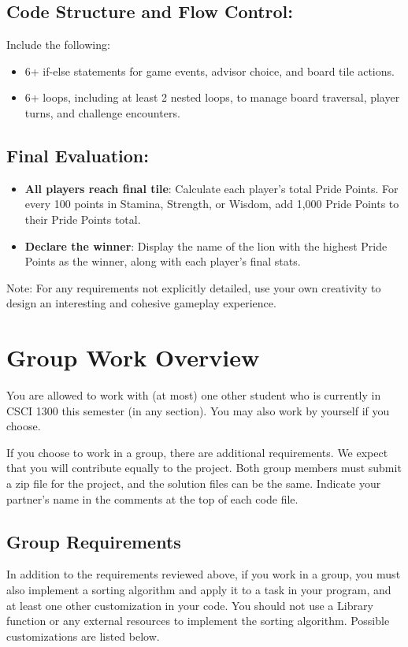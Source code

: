 \subsection{Code Structure and Flow Control:}
Include the following:
\begin{itemize}
    \item 6+ if-else statements for game events, advisor choice, and board tile actions.
    \item 6+ loops, including at least 2 nested loops, to manage board traversal, player turns, and challenge encounters.
\end{itemize}


\subsection{Final Evaluation:}
\begin{itemize}
    \item \textbf{All players reach final tile}: Calculate each player's total Pride Points. For every 100 points in Stamina, Strength, or Wisdom, add 1,000 Pride Points to their Pride Points total. 
    \item \textbf{Declare the winner}: Display the name of the lion with the highest Pride Points as the winner, along with each player’s final stats. 
\end{itemize}

Note: For any requirements not explicitly detailed, use your own creativity to design an interesting and cohesive gameplay experience. 

\section{\textbf{Group Work Overview}}

You are allowed to work with (at most) one other student who is currently in CSCI 1300 this semester (in any section). You may also work by yourself if you choose.

If you choose to work in a group, there are additional requirements. We expect that you will contribute equally to the project. Both group members must submit a zip file for the project, and the solution files can be the same. Indicate your partner’s name in the comments at the top of each code file.


\subsection{Group Requirements}
In addition to the requirements reviewed above, if you work in a group, you must also implement a sorting algorithm and apply it to a task in your program, and at least one other customization in your code. You should not use a Library function or any external resources to implement the sorting algorithm. Possible customizations are listed below.

